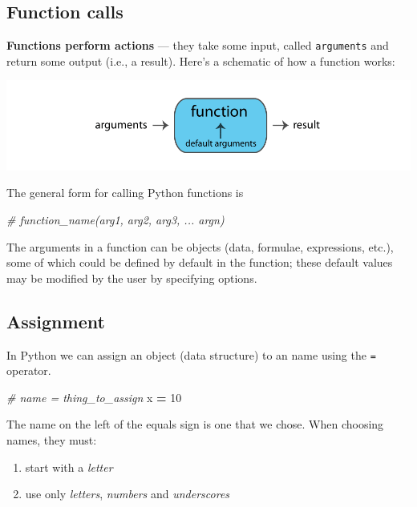 \documentclass[
]{book}
\newenvironment{Shaded}{\begin{snugshade}}{\end{snugshade}}
\newcommand{\CommentTok}[1]{\textcolor[rgb]{0.56,0.35,0.01}{\textit{#1}}}
\newcommand{\DecValTok}[1]{\textcolor[rgb]{0.00,0.00,0.81}{#1}}
\newcommand{\NormalTok}[1]{#1}
\newcommand{\OperatorTok}[1]{\textcolor[rgb]{0.81,0.36,0.00}{\textbf{#1}}}
\providecommand{\tightlist}{%
  \setlength{\itemsep}{0pt}\setlength{\parskip}{0pt}}
\begin{document}
\hypertarget{function-calls-1}{%
\subsection{Function calls}\label{function-calls-1}}

\textbf{Functions perform actions} --- they take some input, called \texttt{arguments} and return some
output (i.e., a result). Here's a schematic of how a function works:

\includegraphics{Python/PythonIntro/images/function.png}

The general form for calling Python functions is

\begin{Shaded}
\begin{Highlighting}[]
\CommentTok{\# function\_name(arg1, arg2, arg3, ... argn)}
\end{Highlighting}
\end{Shaded}

The arguments in a function can be objects (data, formulae, expressions, etc.),
some of which could be defined by default in the function; these default values may
be modified by the user by specifying options.

\hypertarget{assignment-1}{%
\subsection{Assignment}\label{assignment-1}}

In Python we can assign an object (data structure) to an name using the \texttt{=} operator.

\begin{Shaded}
\begin{Highlighting}[]
\CommentTok{\# name = thing\_to\_assign}
\NormalTok{x }\OperatorTok{=} \DecValTok{10}
\end{Highlighting}
\end{Shaded}

The name on the left of the equals sign is one that we chose. When choosing names, they must:

\begin{enumerate}
\def\labelenumi{\arabic{enumi}.}
\tightlist
\item
  start with a \emph{letter}
\item
  use only \emph{letters}, \emph{numbers} and \emph{underscores}
\end{enumerate}
\end{document}
